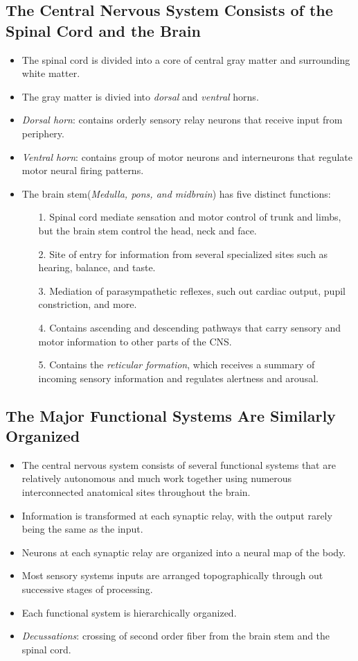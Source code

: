 \documentclass[12pt,a4paper]{article}
\begin{document}
\subsection{The Central Nervous System Consists of the Spinal Cord and the Brain}
\begin{itemize}
    \item The spinal cord is divided into a core of central gray matter and surrounding white matter.
    \item The gray matter is divied into \textit{dorsal} and \textit{ventral} horns.
    \item \textit{Dorsal horn}: contains orderly sensory relay neurons that receive input from periphery.
    \item \textit{Ventral horn}: contains group of motor neurons and interneurons that regulate motor neural firing patterns.
    \item The brain stem(\textit{Medulla, pons, and midbrain}) has five distinct functions:
        \begin{itemize}
            \item[1.] Spinal cord mediate sensation and motor control of trunk and limbs, but the brain stem control the head, neck and face.
            \item[2.] Site of entry for information from several specialized sites such as hearing, balance, and taste.
            \item[3.] Mediation of parasympathetic reflexes, such out cardiac output, pupil constriction, and more.
            \item[4.] Contains ascending and descending pathways that carry sensory and motor information to other parts of the CNS.
            \item[5.] Contains the \textit{reticular formation}, which receives a summary of incoming sensory information and regulates alertness and arousal.    
        \end{itemize}
\end{itemize}
\subsection{The Major Functional Systems Are Similarly Organized}
\begin{itemize}
    \item The central nervous system consists of several functional systems that are relatively autonomous and much work together using numerous interconnected anatomical sites throughout the brain.
    \item Information is transformed at each synaptic relay, with the output rarely being the same as the input.
    \item Neurons at each synaptic relay are organized into a neural map of the body.
    \item Most sensory systems inputs are arranged topographically through out successive stages of processing.
    \item Each functional system is hierarchically organized.
    \item \textit{Decussations}: crossing of second order fiber from the brain stem and the spinal cord.
\end{itemize}
\end{document}
